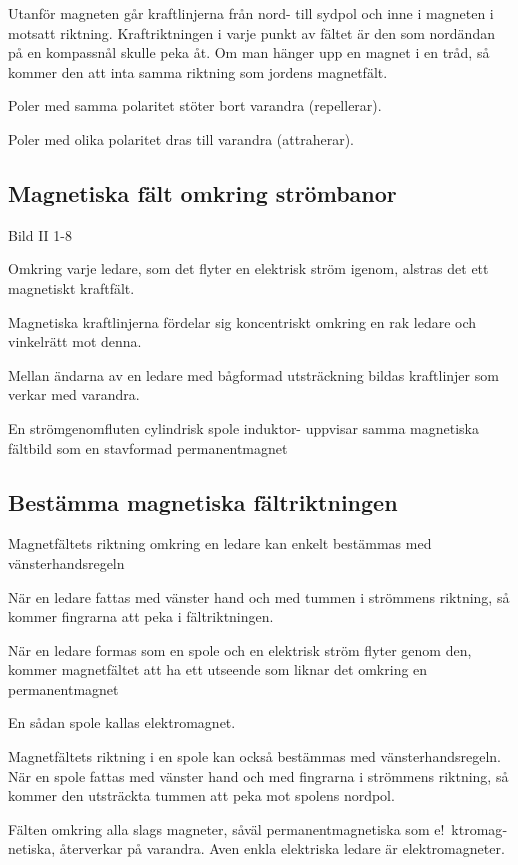 Utanför magneten går kraftlinjerna från nord- till sydpol och inne i magneten i motsatt
riktning. Kraftriktningen i varje punkt av fältet är den som nordändan på en kompassnål
skulle peka åt. Om man hänger upp en magnet i en tråd, så kommer den att inta
samma riktning som jordens magnetfält.

Poler med samma polaritet stöter bort varandra (repellerar).

Poler med olika polaritet dras till varandra (attraherar).

\subsection{Magnetiska fält omkring strömbanor}

Bild II 1-8

Omkring varje ledare, som det flyter en elektrisk ström igenom, alstras det ett
magnetiskt kraftfält.

Magnetiska kraftlinjerna fördelar sig koncentriskt omkring en rak ledare och vinkelrätt
mot denna.

Mellan ändarna av en ledare med bågformad utsträckning bildas kraftlinjer som verkar med
varandra.

En strömgenomfluten cylindrisk spole induktor- uppvisar samma magnetiska fältbild som en stavformad permanentmagnet

\subsection{Bestämma magnetiska fältriktningen}

Magnetfältets riktning omkring en ledare kan enkelt bestämmas med vänsterhandsregeln

När en ledare fattas med vänster hand och med tummen i strömmens riktning, så
kommer fingrarna att peka i fältriktningen.

När en ledare formas som en spole och en elektrisk ström flyter genom den, kommer
magnetfältet att ha ett utseende som liknar det omkring en permanentmagnet

En sådan spole kallas elektromagnet.

Magnetfältets riktning i en spole kan också bestämmas med vänsterhandsregeln.
När en spole fattas med vänster hand och med fingrarna i strömmens riktning, så
kommer den utsträckta tummen att peka mot spolens nordpol.

Fälten omkring alla slags magneter, såväl permanentmagnetiska som e!~ktromag­
netiska, återverkar på varandra. Aven enkla
elektriska ledare är elektromagneter.

